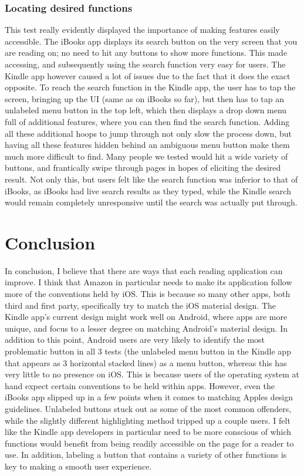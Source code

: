 \documentclass[11pt, oneside]{article}
\begin{document}
\subsubsection{Locating desired functions}
This test really evidently displayed the importance of making features easily accessible. The iBooks app displays its search button on the very screen that you are reading on; no need to hit any buttons to show more functions. This made accessing, and subsequently using the search function very easy for users. The Kindle app however caused a lot of issues due to the fact that it does the exact opposite. To reach the search function in the Kindle app, the user has to tap the screen, bringing up the UI (same as on iBooks so far), but then has to tap an unlabeled menu button in the top left, which then displays a drop down menu full of additional features, where you can then find the search function. Adding all these additional hoops to jump through not only slow the process down, but having all these features hidden behind an ambiguous menu button make them much more difficult to find. Many people we tested would hit a wide variety of buttons, and frantically swipe through pages in hopes of eliciting the desired result. Not only this, but users felt like the search function was inferior to that of iBooks, as iBooks had live search results as they typed, while the Kindle search would remain completely unresponsive until the search was actually put through.

\section{Conclusion}
In conclusion, I believe that there are ways that each reading application can improve. I think that Amazon in particular needs to make its application follow more of the conventions held by iOS. This is because so many other apps, both third and first party, specifically try to match the iOS material design. The Kindle app's current design might work well on Android, where apps are more unique, and focus to a lesser degree on matching Android's material design. In addition to this point, Android users are very likely to identify the most problematic button in all 3 tests (the unlabeled menu button in the Kindle app that appears as 3 horizontal stacked lines) as a menu button, whereas this has very little to no presence on iOS. This is because users of the operating system at hand expect certain conventions to be held within apps. However, even the iBooks app slipped up in a few points when it comes to matching Apples design guidelines. Unlabeled buttons stuck out as some of the most common offenders, while the slightly different highlighting method tripped up a couple users. I felt like the Kindle app developers in particular need to be more conscious of which functions would benefit from being readily accessible on the page for a reader to use. In addition, labeling a button that contains a variety of other functions is key to making a smooth user experience.
\end{document}
